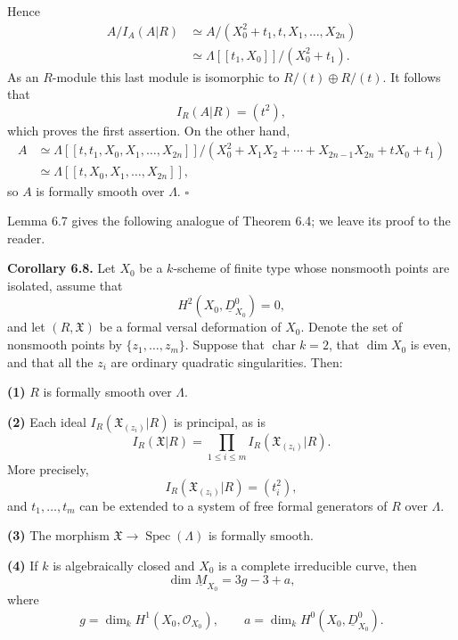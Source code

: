 Hence
\[
\begin{aligned}
A/I_A(A|R)
&\simeq A/(X_0^2+t_1,t,X_1,\ldots,X_{2n})\\
&\simeq\Lambda[[t_1,X_0]]/(X_0^2+t_1).
\end{aligned}
\]
As an $R$-module this last module is isomorphic to
$R/(t)\oplus R/(t)$. It follows that
\[
I_R(A|R)=(t^2),
\]
which proves the first assertion. On the other hand,
\[
\begin{aligned}
A
&\simeq
\Lambda[[t,t_1,X_0,X_1,\ldots,X_{2n}]]/
 (X_0^2+X_1X_2+\cdots+X_{2n-1}X_{2n}+tX_0+t_1)\\
&\simeq\Lambda[[t,X_0,X_1,\ldots,X_{2n}]],
\end{aligned}
\]
so $A$ is formally smooth over $\Lambda$.
\hfill$\square$

Lemma 6.7 gives the following analogue of Theorem 6.4; we leave its
proof to the reader.

\par\medskip
\noindent\textbf{Corollary 6.8.}
Let $X_0$ be a $k$-scheme of finite type whose nonsmooth points are
isolated, assume that
\[
H^2(X_0,\underline D^0_{X_0})=0,
\]
and let $(R,\mathfrak X)$ be a formal versal deformation of $X_0$.
Denote the set of nonsmooth points by $\{z_1,\ldots,z_m\}$. Suppose
that $\operatorname{char}k=2$, that $\dim X_0$ is even, and that all
the $z_i$ are ordinary quadratic singularities. Then:

\smallskip
\noindent\textbf{(1)} $R$ is formally smooth over $\Lambda$.

\smallskip
\noindent\textbf{(2)} Each ideal
$I_R(\mathfrak X_{(z_i)}|R)$ is principal, as is
\[
I_R(\mathfrak X|R)
=\prod_{1\leq i\leq m}I_R(\mathfrak X_{(z_i)}|R).
\]
More precisely,
\[
I_R(\mathfrak X_{(z_i)}|R)=(t_i^2),
\]
and $t_1,\ldots,t_m$ can be extended to a system of free formal
generators of $R$ over $\Lambda$.

\smallskip
\noindent\textbf{(3)} The morphism
$\mathfrak X\longrightarrow\operatorname{Spec}(\Lambda)$ is formally
smooth.

\smallskip
\noindent\textbf{(4)} If $k$ is algebraically closed and $X_0$ is a
complete irreducible curve, then
\[
\dim\underline M_{X_0}=3g-3+a,
\]
where
\[
g=\dim_kH^1(X_0,\mathcal O_{X_0}),
\qquad
a=\dim_kH^0(X_0,\underline D^0_{X_0}).
\]
